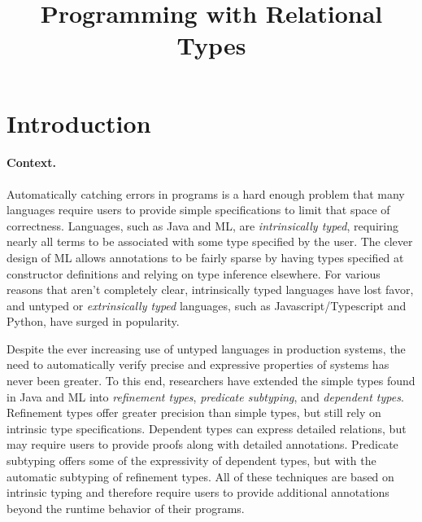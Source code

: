 \documentclass[acmsmall]{acmart}
\title{Programming with Relational Types}
\begin{document}
\newcommand{\code}[1]{\texttt{#1}}
\newcommand{\claim}{\ \vdash\ }
\newcommand{\hastype}{\ \ddagger\ }
\newcommand{\subtypes}{\ \sqsubseteq\ }
\newcommand{\I}{\hspace{4mm}}
\newcommand{\B}[1]{\textbf{#1}}
\newcommand{\F}[1]{\text{#1}}
\newcommand{\bigand}{\bigwedge\nolimits}
\newcommand{\C}[1]{\color{teal} \rhd\ \emph{#1}}
\newcommand{\FIG}[1]{Fig. {\color{red} \ref{#1}}}
\newcommand{\TODO}[1]{\noindent \textbf{\color{red} TODO: #1}}
     



\maketitle


\section{Introduction}

\paragraph{Context.} 
Automatically catching errors in programs is a hard enough problem
that many languages require users to provide simple specifications to limit that space of correctness.
Languages, such as Java and ML, are \textit{intrinsically typed}, 
requiring nearly all terms to be associated with some type specified by the user. 
The clever design of ML allows annotations to be fairly sparse by 
having types specified at constructor definitions and relying on type inference elsewhere.
For various reasons that aren't completely clear, intrinsically typed languages have lost favor,
and untyped or \textit{extrinsically typed} languages, 
such as Javascript/Typescript and Python, have surged in popularity. 

Despite the ever increasing use of untyped languages in production systems, 
the need to automatically verify precise and expressive properties of systems has never been greater.
To this end, researchers have extended the simple types found in Java and ML into 
\textit{refinement types}, \textit{predicate subtyping}, and \textit{dependent types}. 
Refinement types offer greater precision than simple types, but still rely on intrinsic type specifications.
Dependent types can express detailed relations, but may require users to provide proofs along with detailed annotations.
Predicate subtyping offers some of the expressivity of dependent types, but with the automatic subtyping of refinement types.
All of these techniques are based on intrinsic typing and therefore require users to provide additional annotations
beyond the runtime behavior of their programs.
\end{document}
